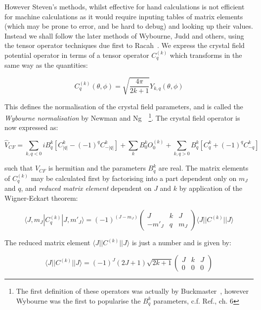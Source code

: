 \documentclass[12pt,onecolumn,tightenlines,aps,amsmath,floatfix,notitlepage,nofootinbib]{revtex4}
\newcommand{\bra}[1]{\langle #1|}
\newcommand{\ket}[1]{|#1\rangle}
\begin{document}
However Steven's methods, whilst effective for hand calculations is not efficient for machine calculations as it would require inputing tables of matrix elements (which may be prone to error, and be hard to debug) and looking up their values. Instead we shall follow the later methods of Wybourne, Judd and others, using the tensor operator techniques due first to Racah~\cite{juddbook}. We express the crystal field potential operator in terms of a tensor operator $C_q^{(k)}$ which transforms in the same way as the quantities:

\begin{equation} \label{eq:wy-norm}
C_q^{(k)}(\theta,\phi) = \sqrt{\frac{4\pi}{2k+1}} Y_{k,q}(\theta,\phi)
\end{equation}

This defines the normalisation of the crystal field parameters, and is called the \emph{Wybourne normalisation} by Newman and Ng~\cite{NN00}~\footnote{The first definition of these operators was actually by Buckmaster~\cite{buckmaster62}, however Wybourne was the first to popularise the $B_q^k$ parameters, c.f. Ref.\cite{wybournebook}, ch. 6}. The crystal field operator is now expressed as:

\begin{equation} \label{eq:wyCF}
\hat{V}_{CF} = \sum_{k,q<0} i B_q^k \left[ C_{|q|}^{k} - (-1)^q C_{-|q|}^{k} \right] + \sum_k B_0^k O_0^{(k)} + \sum_{k,q>0} B_q^k \left[ C_q^{k} + (-1)^q C_{-q}^{k} \right]
\end{equation}

\noindent such that $\hat{V}_{CF}$ is hermitian and the parameters $B_q^k$ are real. The matrix elements of $C_q^{(k)}$ may be calculated first by factorising into a part dependent only on $m_J$ and $q$, and \emph{reduced matrix element} dependent on $J$ and $k$ by application of the Wigner-Eckart theorem:

\begin{equation} \label{eq:wyop-wigner-eckart}
\bra{J,m_J} C_q^{(k)} \ket{J,m'_J} = (-1)^(J-m_J) \left( \begin{array}{ccc} J & k & J \\ -m'_J & q & m_J \end{array} \right) \bra{J}|C^{(k)}|\ket{J}
\end{equation}

\noindent The reduced matrix element $\bra{J}|C^{(k)}|\ket{J}$ is just a number and is given by:

\begin{equation} \label{eq:redmat}
\bra{J}|C^{(k)}|\ket{J} = (-1)^J (2J+1) \sqrt{2k+1} \left( \begin{array}{ccc} J & k & J \\ 0 & 0 & 0\end{array} \right)
\end{equation}
\end{document}
